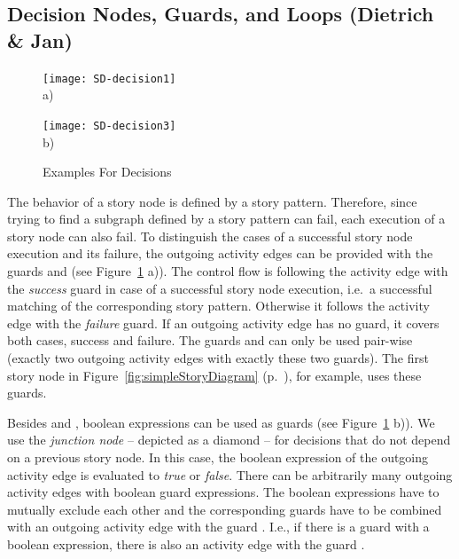 \subsection{Decision Nodes, Guards, and Loops (Dietrich \& Jan)}
\label{sec:DecisionNodesEtc}
\begin{figure}[htb]
	\centering
  \begin{minipage}[t]{.5\textwidth}
    \centering
    \texttt{[image: SD-decision1]}
    \\a)
  \end{minipage}%
  \hfill
  \begin{minipage}[t]{.5\textwidth}
    \centering
    \texttt{[image: SD-decision3]}
    \\b)
  \end{minipage}
  \caption{Examples For Decisions}
  \label{fig:SD-decisions}
\end{figure}

The behavior of a story node is defined by a story pattern.
Therefore,
since trying to find a subgraph defined by a story pattern can fail,
each execution of a story node can also fail.
To distinguish the cases of a successful story node execution and its failure,
the outgoing activity edges can be provided with the guards  and  (see Figure~\ref{fig:SD-decisions} a)).
The control flow is following the activity edge with the \emph{success} guard in case of a successful story node execution,
i.e.\ a successful matching of the corresponding story pattern.
Otherwise it follows the activity edge with the \emph{failure} guard.
If an outgoing activity edge has no guard, it covers both cases, success and failure.
The guards  and  can only be used pair-wise (exactly two outgoing activity edges with exactly these two guards).
The first story node in Figure~\ref{fig:simpleStoryDiagram} (p.~\pageref{fig:simpleStoryDiagram}), for example, uses these guards.

Besides  and , boolean expressions can be used as guards (see Figure~\ref{fig:SD-decisions} b)).
We use the \emph{junction node} -- depicted as a diamond -- for decisions that do not depend on a previous story node.
In this case, the boolean expression of the outgoing activity edge is evaluated to \emph{true} or \emph{false}.
There can be arbitrarily many outgoing activity edges with boolean guard expressions.
The boolean expressions have to mutually exclude each other
and the corresponding guards have to be combined with an outgoing activity edge with the guard .
I.e., if there is a guard with a boolean expression, there is also an activity edge with the guard .

